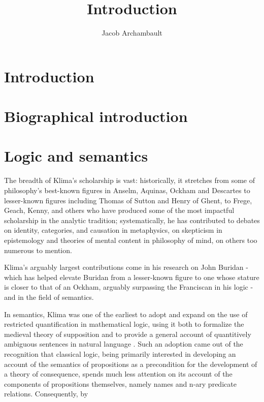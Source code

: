 \documentclass[]{article}
\title{Introduction}
\author{Jacob Archambault}
\begin{document}
\maketitle

\begin{abstract}

\end{abstract}

\section{Introduction}
\section{Biographical introduction}
\section{Logic and semantics}
The breadth of Klima's scholarship is vast: 
historically, it stretches from some of philosophy's best-known figures in Anselm, Aquinas, Ockham and Descartes to lesser-known figures including Thomas of Sutton and Henry of Ghent, to Frege, Geach, Kenny, and others who have produced some of the most impactful scholarship in the analytic tradition; 
systematically, he has contributed to debates on identity, categories, and causation in metaphysics, on skepticism in epistemology and theories of mental content in philosophy of mind, on others too numerous to mention.

Klima's arguably largest contributions come in his research on John Buridan - which has helped elevate Buridan from a lesser-known figure to one whose stature is closer to that of an Ockham, arguably surpassing the Franciscan in his logic - and in the field of semantics. 

In semantics, Klima was one of the earliest to adopt and expand on the use of restricted quantification in mathematical logic, using it both to formalize the medieval theory of supposition and to provide a general account of quantitively ambiguous sentences in natural language \autocite{Klima1988,Klima1990,KlimaSandu1990,Klima1991b}. Such an adoption came out of the recognition that classical logic, being primarily interested in developing an account of the semantics of propositions as a precondition for the development of a theory of consequence, spends much less attention on its account of the components of propositions themselves, namely names and n-ary predicate relations. Consequently, by 
\end{document}
